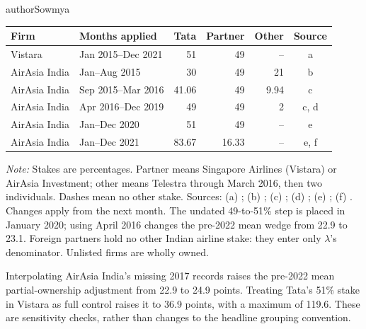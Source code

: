 \begin{mergedcontribution}{authorSowmya}
\begin{minipage}{\linewidth}
\label{tab:o1-stakes}
\centering
{\footnotesize{}\setlength{\tabcolsep}{4pt}
\fontsize{10}{12}\selectfont{}\setlength{\tabcolsep}{3pt}
\renewcommand{\arraystretch}{1.15}
\begin{tabular}{|l|l|r|r|r|c|}
\hline
\textbf{Firm} & \textbf{Months applied} & \textbf{Tata} & \textbf{Partner} & \textbf{Other} & \textbf{Source} \\
\hline
Vistara & Jan 2015--Dec 2021 & 51 & 49 & -- & a \\
\hline
AirAsia India & Jan--Aug 2015 & 30 & 49 & 21 & b \\
\hline
AirAsia India & Sep 2015--Mar 2016 & 41.06 & 49 & 9.94 & c \\
\hline
AirAsia India & Apr 2016--Dec 2019 & 49 & 49 & 2 & c, d \\
\hline
AirAsia India & Jan--Dec 2020 & 51 & 49 & -- & e \\
\hline
AirAsia India & Jan--Dec 2021 & 83.67 & 16.33 & -- & e, f \\
\hline
\end{tabular}\par}
\vspace{4pt}
{\footnotesize{}\raggedright\textit{Note:} Stakes are percentages. Partner means Singapore Airlines (Vistara) or AirAsia Investment; other means Telestra through March 2016, then two individuals. Dashes mean no other stake. Sources: (a) \textcite{sia2015annual,sia2022merger}; (b) \textcite{airasia2013jv}; (c) \textcite{tata2016airasia}; (d) \textcite{airasia2018q4}; (e) \textcite{airasia2021disposal}; (f) \textcite{airasia2021results}. Changes apply from the next month. The undated 49-to-51\% step is placed in January 2020; using April 2016 changes the pre-2022 mean wedge from 22.9 to 23.1. Foreign partners hold no other Indian airline stake: they enter only $\lambda$'s denominator. Unlisted firms are wholly owned.\par}
\end{minipage}

Interpolating AirAsia India's missing 2017 records raises the pre-2022 mean partial-ownership adjustment from 22.9 to 24.9 points. Treating Tata's 51\% stake in Vistara as full control raises it to 36.9 points, with a maximum of 119.6. These are sensitivity checks, rather than changes to the headline grouping convention.


\end{mergedcontribution}
